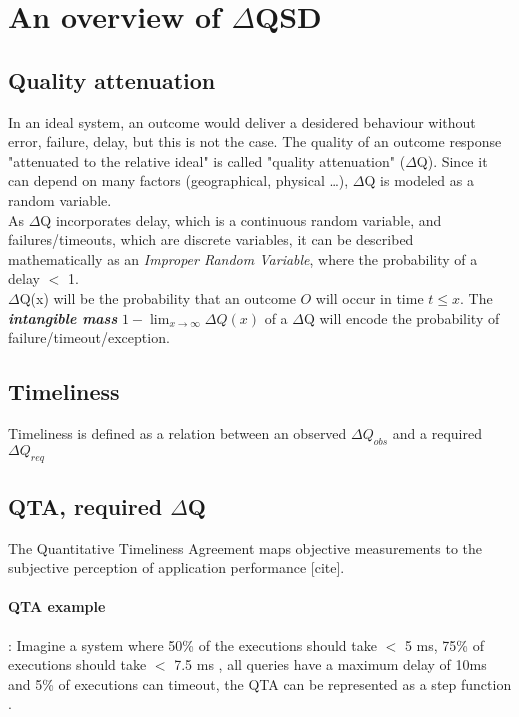 \section{An overview of $\Delta$QSD}
    \subsection{Quality attenuation}
        In an ideal system, an outcome would deliver a desidered behaviour without error, failure, delay, but this is not the case. The quality of an outcome response "attenuated to the relative ideal" is called "quality attenuation" ($\Delta$Q). Since it can depend on many factors (geographical, physical \dots), $\Delta$Q is modeled as a random variable. \\
    As $\Delta$Q incorporates delay, which is a continuous random variable, and failures/timeouts, which are discrete variables, it can be described mathematically as an \textit{Improper Random Variable}, where the probability of a delay $<$ 1. \\
    $\Delta$Q(x) will be the probability that an outcome $O$ will occur in time $t \le x$. The \textbf{\textit{intangible mass}} $1 - \lim_{x\to\infty}\Delta Q(x)$ of a $\Delta$Q will encode the probability of failure/timeout/exception.


    \subsection{Timeliness}
        Timeliness is defined as a relation between an observed $\Delta Q_{obs}$ and a required $\Delta Q_{req}$
     \subsection{QTA, required $\Delta$Q}
         The Quantitative Timeliness Agreement maps objective measurements to the subjective perception of application performance [cite].
         \paragraph{QTA example}: Imagine a system where 50\% of the executions should take $<$ 5 ms, 75\% of executions should take $<$ 7.5 ms , all queries have a maximum delay of 10ms and 5\% of executions can timeout, the QTA can be represented as a step function .%

